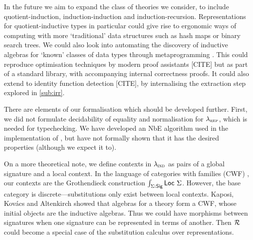 
In the future we aim to expand the class of theories we consider, to include
quotient-induction, induction-induction and induction-recursion. Representations
for quotient-inductive types in particular could give rise to ergonomic ways of
computing with more `traditional' data structures such as hash maps or binary
search trees. We could also look into automating the discovery of inductive algebras for
`known' classes of data types through metaprogramming \cite{Dagand2017-nj}. This
could reproduce optimisation techniques by modern proof assistants [CITE] but as
part of a standard library, with accompanying internal correctness proofs. It
could also extend to identity function detection [CITE], by internalising the
extraction step explored in \cref{sub:irr}.

There are elements of our formalisation which should be developed further.
First, we did not formulate decidability of equality and normalisation for
$\lambda_{\textsc{rep}}$, which is needed for typechecking. We have developed an NbE
algorithm used in the implementation of \superfluid, but have not formally shown
that it has the desired properties (although we expect it to).



On a more theoretical note, we define contexts in $\lambda_{\textsc{ind}}$ as pairs of a
global signature and a local context. In the language of categories with
families (CWF) \cite{Castellan2019-qo}, our contexts are the Grothendieck
construction $\int _{\Sigma : \textsf{Sig}} \textsf{Loc}\ \Sigma$. However, the base
category is discrete---substitutions only exist between local contexts. Kaposi,
Kov\'acs and Altenkirch \cite{Kaposi2019-pj} showed that algebras for a theory
form a CWF, whose initial objects are the inductive algebras. Thus we could have
morphisms between signatures when one signature can be represented in terms of
another. Then $\mathcal{R}$ could become a special case of the substitution calculus over
representations.

